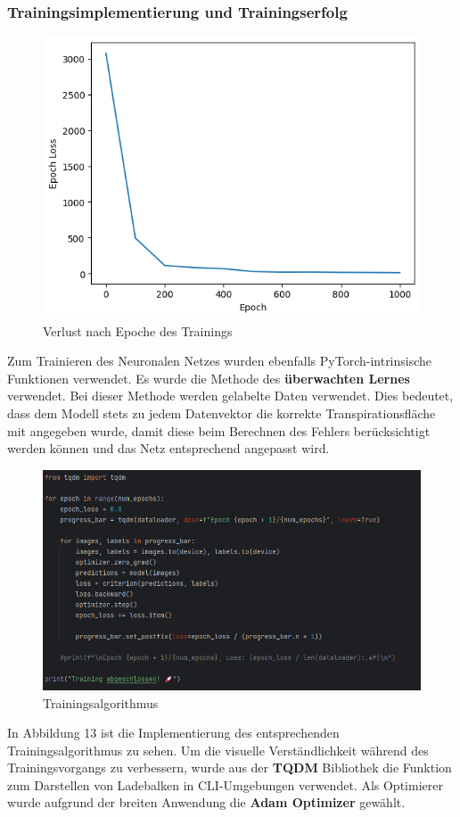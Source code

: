 \subsubsection{Trainingsimplementierung und Trainingserfolg}
\begin{figure}
    \centering
    \includegraphics[width=0.8\linewidth]{loss.png}
    \caption{Verlust nach Epoche des Trainings}
    \label{fig:enter-label}
\end{figure}
Zum Trainieren des Neuronalen Netzes wurden ebenfalls PyTorch-intrinsische Funktionen verwendet. Es wurde die Methode des \textbf{überwachten Lernes} verwendet. Bei dieser Methode werden gelabelte Daten verwendet. Dies bedeutet, dass dem Modell stets zu jedem Datenvektor die korrekte Transpirationsfläche mit angegeben wurde, damit diese beim Berechnen des Fehlers berücksichtigt werden können und das Netz entsprechend angepasst wird.
\begin{figure}
    \centering
    \includegraphics[width=1\linewidth]{Screenshot 2025-03-30 171125.png}
    \caption{Trainingsalgorithmus}
    \label{fig:enter-label}
\end{figure}
In Abbildung 13 ist die Implementierung des entsprechenden Trainingsalgorithmus zu sehen. Um die visuelle Verständlichkeit während des Trainingsvorgangs zu verbessern, wurde aus der \textbf{TQDM} Bibliothek die Funktion zum Darstellen von Ladebalken in CLI-Umgebungen verwendet. Als Optimierer wurde aufgrund der breiten Anwendung die \textbf{Adam Optimizer} gewählt.
